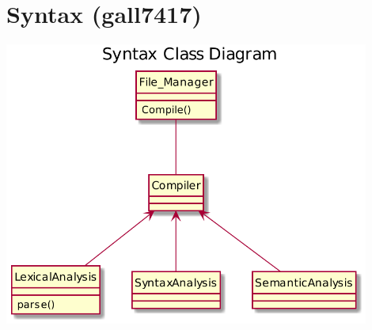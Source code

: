 \documentclass[11pt]{report}
\begin{document}
\section{Syntax (gall7417)}
    \begin{minipage}{0.9\textwidth}
        \begin{center}
        \includegraphics[width=0.9\textwidth]{diagrams/SyntaxClass}
        \end{center}
    \end{minipage}
\end{document}
